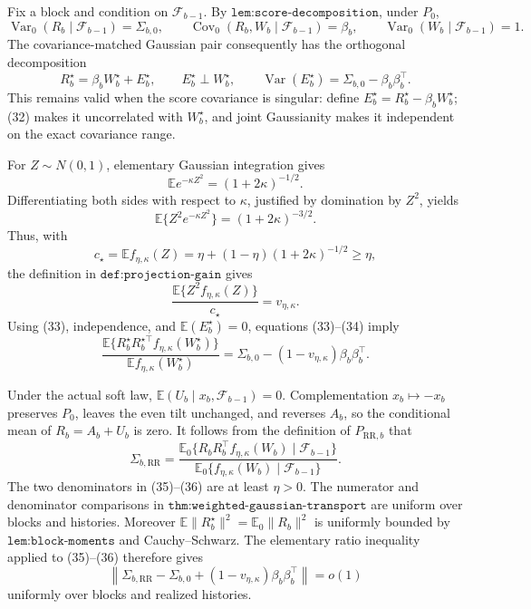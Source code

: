 Fix a block and condition on \(\mathcal F_{b-1}\).  By \(\texttt{lem:score-decomposition}\), under \(P_0\),
\[
 \operatorname{Var}_0(R_b\mid\mathcal F_{b-1})=\Sigma_{b,0},
 \qquad \operatorname{Cov}_0(R_b,W_b\mid\mathcal F_{b-1})=\beta_b,
 \qquad \operatorname{Var}_0(W_b\mid\mathcal F_{b-1})=1.    \tag{32}
\]
The covariance-matched Gaussian pair consequently has the orthogonal decomposition
\[
 R_b^\star=\beta_bW_b^\star+E_b^\star,
 \qquad E_b^\star\perp W_b^\star,
 \qquad \operatorname{Var}(E_b^\star)=\Sigma_{b,0}-\beta_b\beta_b^\top. \tag{33}
\]
This remains valid when the score covariance is singular: define \(E_b^\star=R_b^\star-\beta_bW_b^\star\); (32) makes it uncorrelated with \(W_b^\star\), and joint Gaussianity makes it independent on the exact covariance range.

For \(Z\sim N(0,1)\), elementary Gaussian integration gives
\[
 \mathbb Ee^{-\kappa Z^2}=(1+2\kappa)^{-1/2}.
\]
Differentiating both sides with respect to \(\kappa\), justified by domination by \(Z^2\), yields
\[
 \mathbb E\{Z^2e^{-\kappa Z^2}\}=(1+2\kappa)^{-3/2}.
\]
Thus, with
\[
 c_\star=\mathbb Ef_{\eta,\kappa}(Z)
 =\eta+(1-\eta)(1+2\kappa)^{-1/2}\geq\eta,
\]
the definition in \(\texttt{def:projection-gain}\) gives
\[
 \frac{\mathbb E\{Z^2f_{\eta,\kappa}(Z)\}}{c_\star}
 =v_{\eta,\kappa}.                                          \tag{34}
\]
Using (33), independence, and \(\mathbb E(E_b^\star)=0\), equations (33)--(34) imply
\[
 \frac{\mathbb E\{R_b^\star R_b^{\star\top}f_{\eta,\kappa}(W_b^\star)\}}
      {\mathbb Ef_{\eta,\kappa}(W_b^\star)}
 =\Sigma_{b,0}-(1-v_{\eta,\kappa})\beta_b\beta_b^\top.     \tag{35}
\]

Under the actual soft law, \(\mathbb E(U_b\mid x_b,\mathcal F_{b-1})=0\).  Complementation \(x_b\mapsto-x_b\) preserves \(P_0\), leaves the even tilt unchanged, and reverses \(A_b\), so the conditional mean of \(R_b=A_b+U_b\) is zero.  It follows from the definition of \(P_{\mathrm{RR},b}\) that
\[
 \Sigma_{b,\mathrm{RR}}
 =\frac{\mathbb E_0\{R_bR_b^\top f_{\eta,\kappa}(W_b)\mid\mathcal F_{b-1}\}}
        {\mathbb E_0\{f_{\eta,\kappa}(W_b)\mid\mathcal F_{b-1}\}}.   \tag{36}
\]
The two denominators in (35)--(36) are at least \(\eta>0\).  The numerator and denominator comparisons in \(\texttt{thm:weighted-gaussian-transport}\) are uniform over blocks and histories.  Moreover \(\mathbb E\|R_b^\star\|^2=\mathbb E_0\|R_b\|^2\) is uniformly bounded by \(\texttt{lem:block-moments}\) and Cauchy--Schwarz.  The elementary ratio inequality applied to (35)--(36) therefore gives
\[
 \left\|\Sigma_{b,\mathrm{RR}}-\Sigma_{b,0}
 +(1-v_{\eta,\kappa})\beta_b\beta_b^\top\right\|=o(1)      \tag{37}
\]
uniformly over blocks and realized histories.

